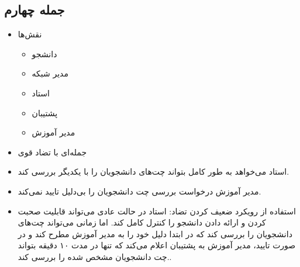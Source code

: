 \documentclass[a4paper]{article}
\begin{document}
\subsection*{جمله چهارم}

\begin{itemize}
    \item نقش‌ها \begin{itemize}
        \item دانشجو
        \item مدیر شبکه
        \item استاد
        \item پشتیبان
        \item مدیر آموزش
    \end{itemize}
    \item جمله‌ای با تضاد قوی
    \item استاد می‌خواهد به طور کامل بتواند چت‌های دانشجویان را با یکدیگر بررسی
    کند.
    \item مدیر آموزش درخواست بررسی چت دانشجویان را بی‌دلیل تایید نمی‌کند.
    \item استفاده از رویکرد ضعیف کردن تضاد: استاد در حالت عادی می‌تواند قابلیت
    صحبت کردن و ارائه دادن دانشجو را کنترل کامل کند. اما زمانی می‌تواند چت‌های
    دانشجویان را بررسی کند که در ابتدا دلیل خود را به مدیر آموزش مطرح کند و در
    صورت تایید، مدیر آموزش به پشتیبان اعلام می‌کند که تنها در مدت ۱۰ دقیقه
    بتواند چت دانشجویان مشخص شده را بررسی کند..
\end{itemize}
\end{document}
